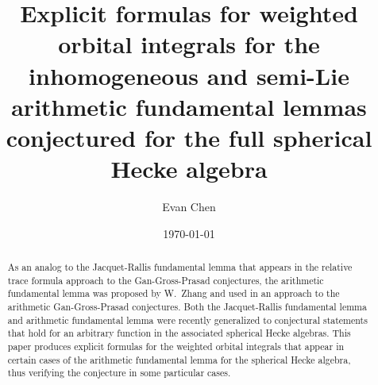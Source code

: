 \documentclass[12pt]{amsart}
\title[Explicit formulas for weighted orbital integrals for AFL]
  {Explicit formulas for weighted orbital integrals for the
  inhomogeneous and semi-Lie arithmetic fundamental lemmas
  conjectured for the full spherical Hecke algebra}
\author{Evan Chen}
\date{\today}
\begin{document}
\maketitle

\begin{abstract}
  As an analog to the Jacquet-Rallis fundamental lemma that appears in the
  relative trace formula approach to the Gan-Gross-Prasad conjectures,
  the arithmetic fundamental lemma was proposed by W.\ Zhang and used in an approach
  to the arithmetic Gan-Gross-Prasad conjectures.
  Both the Jacquet-Rallis fundamental lemma and arithmetic fundamental lemma
  were recently generalized to conjectural statements that hold
  for an arbitrary function in the associated spherical Hecke algebras.
  This paper produces explicit formulas for the weighted orbital integrals that appear
  in certain cases of the arithmetic fundamental lemma for the spherical Hecke algebra,
  thus verifying the conjecture in some particular cases.
\end{abstract}

\tableofcontents
\newpage

















\printbibliography[title=References]
\end{document}
